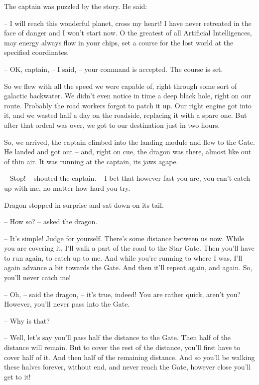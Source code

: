 \documentclass[ebook,twoside,final,openright]{memoir}
\begin{document}
\par
The captain was puzzled by the story. He said:\par
– I will reach this wonderful planet, cross my heart! I have never retreated in the face of danger and I won’t start now. O the greatest of all Artificial Intelligences, may energy always flow in your chips, set a course for the lost world at the specified coordinates.\par
– OK, captain, – I said, – your command is accepted. The course is set.\par
So we flew with all the speed we were capable of, right through some sort of galactic backwater. We didn’t even notice in time a deep black hole, right on our route. Probably the road workers forgot to patch it up. Our right engine got into it, and we wasted half a day on the roadside, replacing it with a spare one. But after that ordeal was over, we got to our destination just in two hours.\par
\par
So, we arrived, the captain climbed into the landing module and flew to the Gate. He landed and got out – and, right on cue, the dragon was there, almost like out of thin air. It was running at the captain, its jaws agape.\par
– Stop! – shouted the captain. – I bet that however fast you are, you can’t catch up with me, no matter how hard you try.\par
Dragon stopped in surprise and sat down on its tail.\par
– How so? – asked the dragon.\par
– It’s simple! Judge for yourself. There’s some distance between us now. While you are covering it, I’ll walk a part of the road to the Star Gate. Then you’ll have to run again, to catch up to me. And while you’re running to where I was, I’ll again advance a bit towards the Gate. And then it’ll repeat again, and again. So, you’ll never catch me!\par
– Oh, – said the dragon, – it’s true, indeed! You are rather quick, aren’t you? However, you’ll never pass into the Gate.\par
– Why is that?\par
– Well, let’s say you’ll pass half the distance to the Gate. Then half of the distance will remain. But to cover the rest of the distance, you’ll first have to cover half of it. And then half of the remaining distance. And so you’ll be walking these halves forever, without end, and never reach the Gate, however close you’ll get to it!\par
\end{document}
